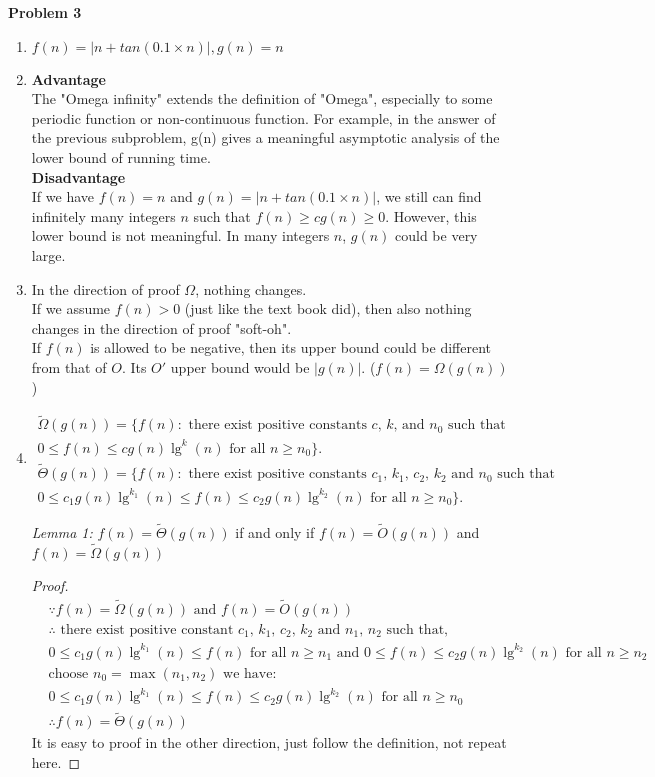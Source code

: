 \documentclass[12pt,letterpaper]{article}
\def\pp{\par\noindent}
\newcommand{\problem}[1]{ \bigskip \pp \textbf{Problem #1}\par}
\newcommand{\lemma}[1]{\medskip\pp\textit{Lemma #1:}}
\begin{document}
\problem{3}
\begin{enumerate}
\item
\begin{solution}
$f(n)=|n+tan(0.1\times n)|, g(n)=n$\\
\end{solution}
\item
\textbf{Advantage}\\
The "Omega infinity" extends the definition of "Omega", especially to some periodic function or non-continuous function. For example, in the answer of the previous subproblem, g(n) gives a meaningful asymptotic analysis of the lower bound of running time.\\
\textbf{Disadvantage}\\
If we have $f(n)=n$ and $g(n)=|n+tan(0.1\times n)|$, we still can find infinitely many integers $n$ such that $f(n)\geq cg(n)\geq 0$. However, this lower bound is not meaningful. In many integers $n$, $g(n)$ could be very large.
\item
In the direction of proof $\Omega$, nothing changes.\\
If we assume $f(n)>0$ (just like the text book did), then also nothing changes in the direction of proof "soft-oh".\\
If $f(n)$ is allowed to be negative, then its upper bound could be different from that of $O$. Its $O'$ upper bound would be $|g(n)|$.  ($f(n)=\Omega(g(n))$)
\item
\begin{align*}
\widetilde{\Omega}(g(n))=\{f(n): \text{ there exist positive constants $c$, $k$, and $n_0$ such that }\\
0\leq f(n)\leq cg(n)\lg^k(n)\text{ for all }n\geq n_0\}.\\
\widetilde{\Theta}(g(n))=\{f(n): \text{ there exist positive constants $c_1$, $k_1$, $c_2$, $k_2$ and $n_0$ such that}\\
0\leq c_1g(n)\lg^{k_1}(n)\leq f(n)\leq c_2g(n)\lg^{k_2}(n)\text{ for all }n\geq n_0\}.
\end{align*}
\lemma{1}
$f(n)=\widetilde{\Theta}(g(n))$ if and only if $f(n)=\widetilde{O}(g(n))$ and $f(n)=\widetilde{\Omega}(g(n))$
\begin{proof}
\begin{align*}
&\because f(n)=\widetilde{\Omega}(g(n))\text{ and }f(n)=\widetilde{O}(g(n))\\
&\therefore \text{ there exist positive constant $c_1$, $k_1$, $c_2$, $k_2$ and $n_1$, $n_2$ such that,}\\
&0\leq c_1g(n)\lg^{k_1}(n)\leq f(n)\text{ for all }n\geq n_1\text{ and }0\leq f(n)\leq c_2g(n)\lg^{k_2}(n)\text{ for all }n\geq n_2\\
&\text{choose } n_0=\max(n_1, n_2)\text{ we have: }\\
&0\leq c_1g(n)\lg^{k_1}(n)\leq f(n)\leq c_2g(n)\lg^{k_2}(n)\text{ for all }n\geq n_0\\
&\therefore f(n)=\widetilde{\Theta}(g(n))
\end{align*}
It is easy to proof in the other direction, just follow the definition, not repeat here.
\end{proof}
\end{enumerate}
\end{document}
